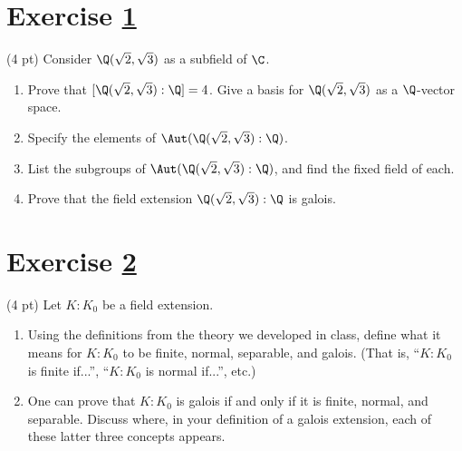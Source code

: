 


\section{Exercise \ref{sec : me02q3}}
\label{sec : me02q3}

(4 pt) Consider $\Q(\sqrt{2}, \sqrt{3})$ as a subfield of $\C$.
\begin{enumerate}[label=(\alph*)]
\item\label{itm : me02q3a} Prove that $[\Q(\sqrt{2}, \sqrt{3}) : \Q] = 4$. Give a basis for $\Q(\sqrt{2}, \sqrt{3})$ as a $\Q$-vector space.
\item\label{itm : me02q3b} Specify the elements of $\Aut(\Q(\sqrt{2}, \sqrt{3}) : \Q)$. 
\item\label{itm : me02q3c} List the subgroups of $\Aut(\Q(\sqrt{2}, \sqrt{3}) : \Q)$, and find the fixed field of each.
\item\label{itm : me02q3d} Prove that the field extension $\Q(\sqrt{2}, \sqrt{3}) : \Q$ is galois.
\end{enumerate}



\section{Exercise \ref{sec : me02q4}}
\label{sec : me02q4}

(4 pt) Let $K : K_{0}$ be a field extension.
\begin{enumerate}[label=(\alph*)]
\item\label{itm : me2q4a} Using the definitions from the theory we developed in class, define what it means for $K : K_{0}$ to be finite, normal, separable, and galois. (That is, ``$K : K_{0}$ is finite if...'', ``$K : K_{0}$ is normal if...'', etc.)
\item\label{itm : me2q4b} One can prove that $K : K_{0}$ is galois if and only if it is finite, normal, and separable. Discuss where, in your definition of a galois extension, each of these latter three concepts appears.
\end{enumerate}